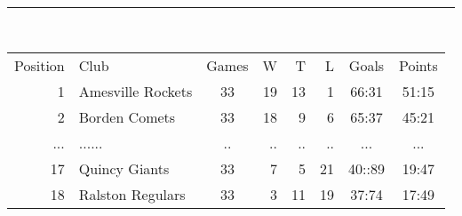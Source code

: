 \documentclass[12pt,twoside,a4paper]{article}   %
\begin{document}
	\rule{8cm}{3mm}\\
	\newpage
	\begin{tabular}{rlcrrrcc}
	Position & Club & Games & W & T & L & Goals & Points\\[0.5ex]
	1 & Amesville Rockets & 33 & 19 & 13 & 1 & 66:31 & 51:15 \\
	2 & Borden Comets     & 33 & 18 &  9 & 6 & 65:37 & 45:21 \\
	... & ......          & .. & .. & .. & .. &...   & ...   \\
	17 & Quincy Giants    & 33 & 7  & 5  & 21 & 40::89 & 19:47 \\
	18 & Ralston Regulars & 33 & 3  & 11 & 19 & 37:74 & 17:49
	\end{tabular}
\end{document}
